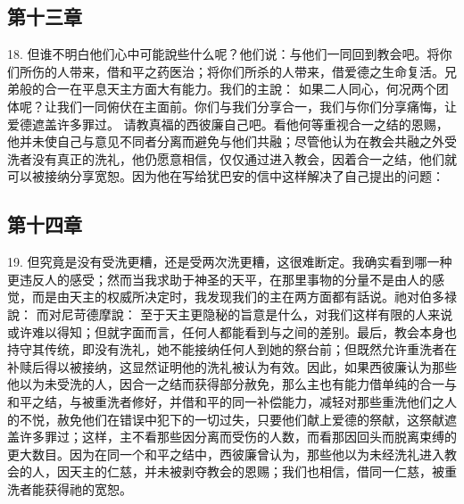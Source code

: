 
\subsection{第十三章}

18. 但谁不明白他们心中可能說些什么呢？他们说：与他们一同回到教会吧。将你们所伤的人带来，借和平之药医治；将你们所杀的人带来，借爱德之生命复活。兄弟般的合一在平息天主方面大有能力。我们的主說：  如果二人同心，何况两个团体呢？让我们一同俯伏在主面前。你们与我们分享合一，我们与你们分享痛悔，让爱德遮盖许多罪过。 请教真福的西彼廉自己吧。看他何等重视合一之结的恩赐，他并未使自己与意见不同者分离而避免与他们共融；尽管他认为在教会共融之外受洗者没有真正的洗礼，他仍愿意相信，仅仅通过进入教会，因着合一之结，他们就可以被接纳分享宽恕。因为他在写给犹巴安的信中这样解决了自己提出的问题：\par


\subsection{第十四章}

19. 但究竟是没有受洗更糟，还是受两次洗更糟，这很难断定。我确实看到哪一种更违反人的感受；然而当我求助于神圣的天平，在那里事物的分量不是由人的感觉，而是由天主的权威所决定时，我发现我们的主在两方面都有話说。祂对伯多禄說： 而对尼苛德摩說：  至于天主更隐秘的旨意是什么，对我们这样有限的人来说或许难以得知；但就字面而言，任何人都能看到与之间的差别。最后，教会本身也持守其传统，即没有洗礼，她不能接纳任何人到她的祭台前；但既然允许重洗者在补赎后得以被接纳，这显然证明他的洗礼被认为有效。因此，如果西彼廉认为那些他以为未受洗的人，因合一之结而获得部分赦免，那么主也有能力借单纯的合一与和平之结，与被重洗者修好，并借和平的同一补偿能力，减轻对那些重洗他们之人的不悦，赦免他们在错误中犯下的一切过失，只要他们献上爱德的祭献，这祭献遮盖许多罪过；这样，主不看那些因分离而受伤的人数，而看那因回头而脱离束缚的更大数目。因为在同一个和平之结中，西彼廉曾认为，那些他以为未经洗礼进入教会的人，因天主的仁慈，并未被剥夺教会的恩赐；我们也相信，借同一仁慈，被重洗者能获得祂的宽恕。\par

